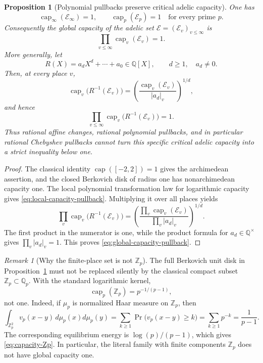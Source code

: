 \documentclass[11pt]{article}
\newtheorem{proposition}[theorem]{Proposition}
\theoremstyle{definition}
\theoremstyle{remark}
\newtheorem{remark}[theorem]{Remark}
\newcommand{\Q}{\mathbb Q}
\newcommand{\capc}{\operatorname{cap}}
\begin{document}
\begin{proposition}[Polynomial pullbacks preserve critical adelic capacity]
\label{prop:adelic-polynomial-capacity}
One has
\[
 \capc_\infty(\mathcal E_\infty)=1,
 \qquad
 \capc_p(\mathcal E_p)=1
 \quad\text{for every prime }p.
\]
Consequently the global capacity of the adelic set
\(\mathcal E=(\mathcal E_v)_{v\leq\infty}\) is
\[
 \prod_{v\leq\infty}\capc_v(\mathcal E_v)=1.
\]
More generally, let
\[
 R(X)=a_dX^d+\cdots+a_0\in\Q[X],
 \qquad d\geq1,\quad a_d\ne0.
\]
Then, at every place \(v\),
\begin{equation}\label{eq:local-capacity-pullback}
 \capc_v\bigl(R^{-1}(\mathcal E_v)\bigr)
 =
 \left(
   \frac{\capc_v(\mathcal E_v)}{|a_d|_v}
 \right)^{1/d},
\end{equation}
and hence
\begin{equation}\label{eq:global-capacity-pullback}
 \boxed{
 \prod_{v\leq\infty}
 \capc_v\bigl(R^{-1}(\mathcal E_v)\bigr)=1.}
\end{equation}
Thus rational affine changes, rational polynomial pullbacks, and in
particular rational Chebyshev pullbacks cannot turn this specific critical
adelic capacity into a strict inequality below one.
\end{proposition}

\begin{proof}
The classical identity
\(\capc([-2,2])=1\) gives the archimedean assertion, and the closed
Berkovich disk of radius one has nonarchimedean capacity one.  The local
polynomial transformation law for logarithmic capacity gives
\eqref{eq:local-capacity-pullback}.  Multiplying it over all places yields
\[
 \prod_v\capc_v\bigl(R^{-1}(\mathcal E_v)\bigr)
 =
 \left(
   \frac{\prod_v\capc_v(\mathcal E_v)}
        {\prod_v|a_d|_v}
 \right)^{1/d}.
\]
The first product in the numerator is one, while the product formula for
\(a_d\in\Q^\times\) gives \(\prod_v|a_d|_v=1\).  This proves
\eqref{eq:global-capacity-pullback}.
\end{proof}

\begin{remark}[Why the finite-place set is not \(\mathbb Z_p\)]
The full Berkovich unit disk in Proposition~\ref{prop:adelic-polynomial-capacity}
must not be replaced silently by the classical compact subset
\(\mathbb Z_p\subset\Q_p\).  With the standard logarithmic kernel,
\begin{equation}\label{eq:capacity-Zp}
 \capc_p(\mathbb Z_p)=p^{-1/(p-1)},
\end{equation}
not one.  Indeed, if \(\mu_p\) is normalized Haar measure on
\(\mathbb Z_p\), then
\[
 \int_{\mathbb Z_p^2}v_p(x-y)\,d\mu_p(x)d\mu_p(y)
 =\sum_{k\geq1}\Pr\bigl(v_p(x-y)\geq k\bigr)
 =\sum_{k\geq1}p^{-k}=\frac1{p-1}.
\]
The corresponding equilibrium energy is
\(\log(p)/(p-1)\), which gives \eqref{eq:capacity-Zp}.
In particular, the literal family with finite components \(\mathbb Z_p\)
does not have global capacity one.
\end{remark}
\end{document}
